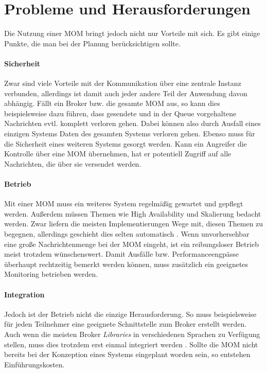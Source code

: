 \section{Probleme und Herausforderungen}
\label{Message Broker:challenges}
Die Nutzung einer MOM bringt jedoch nicht nur Vorteile mit sich. Es gibt einige
Punkte, die man bei der Planung berücksichtigen sollte.

\paragraph{Sicherheit}
Zwar sind viele Vorteile mit der Kommunikation über eine zentrale Instanz
verbunden, allerdings ist damit auch jeder andere Teil der Anwendung davon
abhängig. Fällt ein Broker bzw. die gesamte MOM aus, so kann dies beispielsweise
dazu führen, dass gesendete und in der Queue vorgehaltene Nachrichten evtl.
komplett verloren gehen.
Dabei können also durch Ausfall eines einzigen Systems Daten des gesamten Systems
verloren gehen.
Ebenso muss für die Sicherheit eines weiteren Systems gesorgt werden. Kann ein
Angreifer die Kontrolle über eine MOM übernehmen, hat er potentiell Zugriff auf
alle Nachrichten, die über sie versendet werden. \cite{tanenbaum2007distributed}

\paragraph{Betrieb}
Mit einer MOM muss ein weiteres System regelmäßig gewartet und gepflegt werden.
Außerdem müssen Themen wie High Availability und Skalierung bedacht werden.
Zwar liefern die meisten Implementierungen Wege mit, diesen Themen zu begegnen,
allerdings geschieht dies selten automatisch \cite{RabbitScaling:online}.
Wenn unvorhersehbar eine große Nachrichtenmenge bei der MOM eingeht, ist
ein reibungsloser Betrieb meist trotzdem wünschenswert.
Damit Ausfälle bzw. Performanceengpässe überhaupt rechtzeitig bemerkt werden
können, muss zusätzlich ein geeignetes Monitoring betrieben werden. \cite{dobbelaere2017kafka}

\paragraph{Integration}
Jedoch ist der Betrieb nicht die einzige Herausforderung. So muss beispielsweise
für jeden Teilnehmer eine geeignete Schnittstelle zum Broker erstellt werden.
Auch wenn die meisten Broker \textit{Libraries} in verschiedenen Sprachen zu
Verfügung stellen, muss dies trotzdem erst einmal integriert werden \cite{KafkaClients:online}.
Sollte die MOM nicht bereits bei der Konzeption eines Systems eingeplant worden
sein, so entstehen Einführungskosten.
